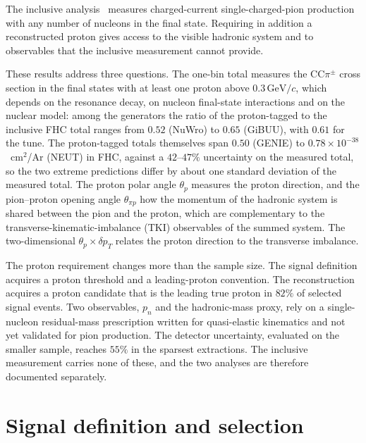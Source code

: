 \documentclass[11pt,a4paper]{article}
\newcommand{\GeVc}{\,\text{GeV}\!/c}
\begin{document}
The inclusive analysis~\cite{incl_note} measures charged-current single-charged-pion production with
any number of nucleons in the final state. Requiring in addition a reconstructed proton gives access to
the  visible hadronic system and to observables that the inclusive measurement cannot provide.

These results address three questions. The one-bin total measures the CC$\pi^\pm$ cross
section in the final states with at least one proton above $0.3\GeVc$, which depends on the resonance
decay, on
nucleon final-state interactions and on the nuclear model: among the generators the ratio of the
proton-tagged to the inclusive FHC total ranges from $0.52$ (NuWro) to $0.65$ (GiBUU), with $0.61$ for
the tune. The proton-tagged totals themselves span $0.50$ (GENIE) to $0.78\times10^{-38}$~cm$^2$/Ar
(NEUT) in FHC, against a $42$--$47\%$ uncertainty on the measured total, so the two extreme predictions
differ by about one standard deviation of the measured total. The proton
polar angle $\theta_p$ measures the proton direction, and the pion--proton opening angle $\theta_{\pi p}$
how the momentum of the hadronic system is shared between the pion and the proton, which are complementary to the
transverse-kinematic-imbalance (TKI) observables of the summed system. The
two-dimensional $\theta_p\times\delta p_T$ relates the proton direction to the transverse imbalance.


%

The proton requirement changes more than the sample size. The signal definition acquires a proton
threshold and a leading-proton convention. The reconstruction acquires a proton candidate that is the
leading true proton in $82\%$ of selected signal events. Two observables, $p_n$ and the hadronic-mass
proxy, rely on a single-nucleon residual-mass prescription written for quasi-elastic kinematics and not
yet validated for pion production. The detector uncertainty, evaluated on the smaller sample, reaches
$55\%$ in the sparsest extractions. The inclusive measurement carries none of these, and the two
analyses are therefore documented separately. 

\section{Signal definition and selection}
\label{sec:pt_selection}
\label{sec:selection_1p}
\label{sec:wtki_cutflow}
\end{document}
